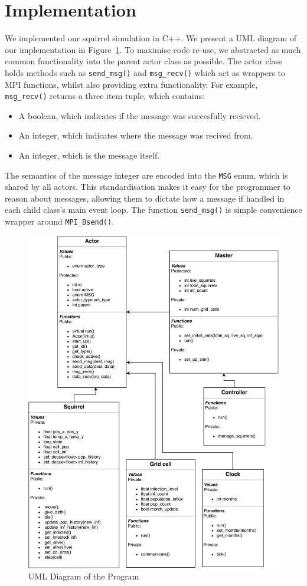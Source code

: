 \documentclass[oneside]{article}
\begin{document}
\section{Implementation}\label{sec:imp}
We implemented our squirrel simulation in C++. We present a UML diagram of our implementation in Figure~\ref{fig:uml}. To maximise code re-use, we abstracted as much common functionality into the parent actor class as possible. The actor class holds methods such as \texttt{send\_msg()} and \texttt{msg\_recv()} which act as wrappers to MPI functions, whilst also providing extra functionality. For example, \texttt{msg\_recv()} returns a three item tuple, which contains:
\begin{itemize}
  \item A boolean, which indicates if the message was succesfully recieved.
  \item An integer, which indicates where the message was recived from.
  \item An integer, which is the message itself.
\end{itemize}
The semantics of the message integer are encoded into the \texttt{MSG} enum, which is shared by all actors. This standardisation makes it easy for the programmer to reason about messages, allowing them to dictate how a message if handled in each child class's main event loop. The function \texttt{send\_msg()} is simple convenience wrapper around \texttt{MPI\_Bsend()}.
\begin{figure}[h]
  \includegraphics[width=\linewidth]{figures/pdp_uml}
  \caption{UML Diagram of the Program}
  \label{fig:uml}
\end{figure}
\end{document}
